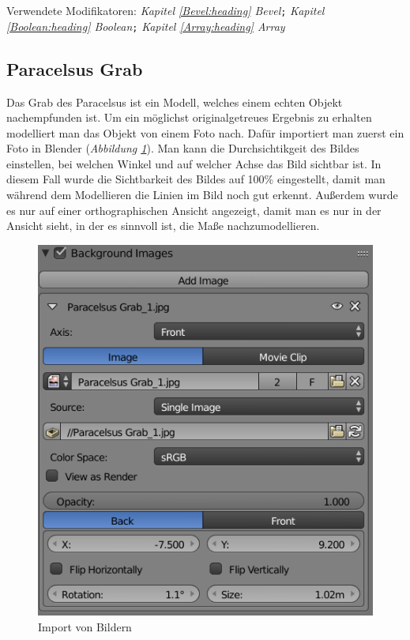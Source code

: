 Verwendete Modifikatoren: \textit{Kapitel \ref{Bevel:heading} \dq Bevel\dq}\verb+;+ \textit{Kapitel \ref{Boolean:heading} \dq Boolean\dq}\verb+;+ \textit{Kapitel \ref{Array:heading} \dq Array\dq}

\subsection{Paracelsus Grab}
\label{paracelsusgrab:ref1}
Das Grab des Paracelsus ist ein Modell, welches einem echten Objekt nachempfunden ist. Um ein möglichst originalgetreues Ergebnis zu erhalten
modelliert man das Objekt von einem Foto nach. Dafür importiert man zuerst ein Foto in Blender (\textit{Abbildung \ref{Paracelsus_Grab:image1}}).
Man kann die Durchsichtikgeit des Bildes einstellen, bei welchen Winkel und auf welcher Achse das Bild sichtbar ist.
In diesem Fall wurde die Sichtbarkeit des Bildes auf 100\% eingestellt, damit man während dem Modellieren die Linien im Bild noch gut erkennt.
Außerdem wurde es nur auf einer orthographischen Ansicht angezeigt, damit man es nur in der Ansicht sieht, in der es sinnvoll ist, die Maße nachzumodellieren.

\raggedbottom
\begin{figure}[H]
    \centering
    \includegraphics[width=.8\textwidth]{images/Paracelsus-Grab_Import-von-Bildern.png}
    \caption{Import von Bildern}
    \label{Paracelsus_Grab:image1}
\end{figure}

